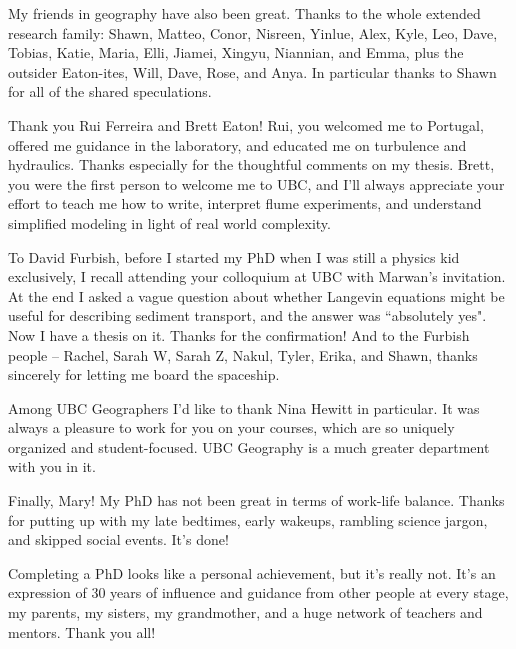 My friends in geography have also been great. Thanks to the whole extended research family: Shawn, Matteo, Conor, Nisreen, Yinlue, Alex, Kyle, Leo, Dave, Tobias, Katie, Maria, Elli, Jiamei, Xingyu, Niannian, and Emma, plus the outsider Eaton-ites, Will, Dave, Rose, and Anya. In particular thanks to Shawn for all of the shared speculations.

Thank you Rui Ferreira and Brett Eaton!
Rui, you welcomed me to Portugal, offered me guidance in the laboratory, and educated me on turbulence and hydraulics. Thanks especially for the thoughtful comments on my thesis.
Brett, you were the first person to welcome me to UBC, and I'll always appreciate your effort to teach me how to write, interpret flume experiments, and understand simplified modeling in light of real world complexity. 

To David Furbish, before I started my PhD when I was still a physics kid exclusively, I recall attending your colloquium at UBC with Marwan's invitation. At the end I asked a vague question about whether Langevin equations might be useful for describing sediment transport, and the answer was ``absolutely yes". Now I have a thesis on it. Thanks for the confirmation! And to the Furbish people -- Rachel, Sarah W, Sarah Z, Nakul, Tyler, Erika, and Shawn, thanks sincerely for letting me board the spaceship.

Among UBC Geographers I'd like to thank Nina Hewitt in particular. It was always a pleasure to work for you on your courses, which are so uniquely organized and student-focused. UBC Geography is a much greater department with you in it.

Finally, Mary! My PhD has not been great in terms of work-life balance. Thanks for putting up with my late bedtimes, early wakeups, rambling science jargon, and skipped social events. It's done!

Completing a PhD looks like a personal achievement, but it's really not.
It's an expression of 30 years of influence and guidance from other people at every stage, my parents, my sisters, my grandmother, and a huge network of teachers and mentors. Thank you all!


\endinput

Mom, during my childhood, you worked full time, taught piano lessons, earned Master and Doctoral degrees, played organ every Sunday, consoled us through every difficulty, and engaged us in as many extracurricular activities as we were willing to take on.
I cannot imagine a better role model of work ethic, open-mindedness, and devotion. I hope I picked a few things up!

